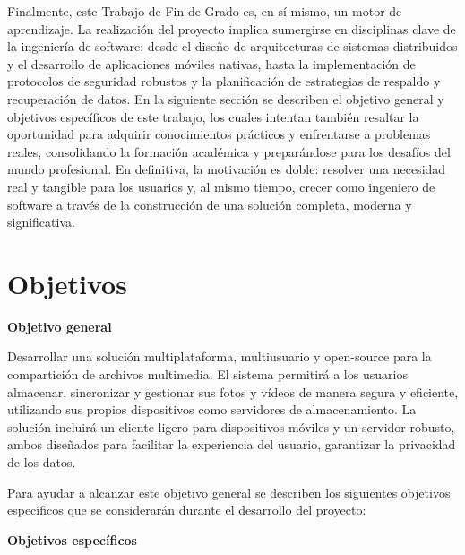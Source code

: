 Finalmente, este Trabajo de Fin de Grado es, en sí mismo, un motor de aprendizaje. La realización del proyecto implica sumergirse en disciplinas clave de la ingeniería de software: desde el diseño de arquitecturas de sistemas distribuidos y el desarrollo de aplicaciones móviles nativas, hasta la implementación de protocolos de seguridad robustos y la planificación de estrategias de respaldo y recuperación de datos. En la siguiente sección se describen el objetivo general y objetivos específicos de este trabajo, los cuales intentan también resaltar la oportunidad para adquirir conocimientos prácticos y enfrentarse a problemas reales, consolidando la formación académica y preparándose para los desafíos del mundo profesional. En definitiva, la motivación es doble: resolver una necesidad real y tangible para los usuarios y, al mismo tiempo, crecer como ingeniero de software a través de la construcción de una solución completa, moderna y significativa.

\section{Objetivos}
\label{sec:objetivos}

\textbf{Objetivo general}

Desarrollar una solución multiplataforma, multiusuario y open-source para la compartición de archivos multimedia. El sistema permitirá a los usuarios almacenar, sincronizar y gestionar sus fotos y vídeos de manera segura y eficiente, utilizando sus propios dispositivos como servidores de almacenamiento. La solución incluirá un cliente ligero para dispositivos móviles y un servidor robusto, ambos diseñados para facilitar la experiencia del usuario, garantizar la privacidad de los datos.

Para ayudar a alcanzar este objetivo general se describen los siguientes objetivos específicos que se considerarán durante el desarrollo del proyecto:

\textbf{Objetivos específicos}

